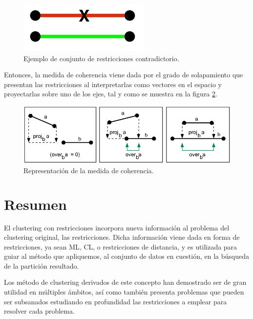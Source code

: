 \begin{figure}[!h]
	\centering
	\includegraphics[scale=0.4]{imagenes/c3/Coherencia/Coher1}
	\caption[Ejemplo de conjunto de restricciones contradictorio.]{Ejemplo de conjunto de restricciones contradictorio. \cite{Survey:2007}}\label{fig:figure17}
\end{figure}

Entonces, la medida de coherencia viene dada por el grado de solapamiento que presentan las restricciones al interpretarlas como vectores en el espacio y proyectarlas sobre uno de los ejes, tal y como se muestra en la figura \ref{fig:figure18}.

\begin{figure}[!h]
	\centering
	\includegraphics[scale=0.4]{imagenes/c3/Coherencia/Coher2}
	\caption[Representación de la medida de coherencia.]{Representación de la medida de coherencia. \cite{Survey:2007}}\label{fig:figure18}
\end{figure}

\section{Resumen}

El clustering con restricciones incorpora nueva información al problema del clustering original, las restricciones. Dicha información viene dada en forma de restricciones, ya sean \acf{ML}, \acf{CL}, o restricciones de distancia, y es utilizada para guiar al método que apliquemos, al conjunto de datos en cuestión, en la búsqueda de la partición resultado.

Los método de clustering derivados de este concepto han demostrado ser de gran utilidad en múltiples ámbitos, así como también presenta problemas que pueden ser subsanados estudiando en profundidad las restricciones a emplear para resolver cada problema.


































